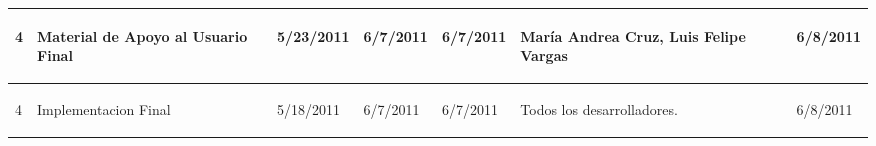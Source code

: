 \begin{center}
\begin{longtable}{|p{}|p{}|p{}|p{}|p{}|p{}|p{}|p{}|}
{\begin{center} 4 \end{center}} & 
{\begin{center} Material de Apoyo al Usuario Final \end{center}} & 
{\begin{center} 5/23/2011 \end{center}} & 
{\begin{center} 6/7/2011 \end{center}} & 
{\begin{center} 6/7/2011 \end{center}} & 
{\begin{center} María Andrea Cruz, Luis Felipe Vargas \end{center}} & 
{\begin{center}  \end{center}} & 
{\begin{center} 6/8/2011 \end{center}}\\
\hline
	
{\begin{center} 4 \end{center}} & 
{\begin{center} Implementacion Final \end{center}} & 
{\begin{center} 5/18/2011 \end{center}} & 
{\begin{center} 6/7/2011 \end{center}} & 
{\begin{center} 6/7/2011 \end{center}} & 
{\begin{center} Todos los desarrolladores. \end{center}} & 
{\begin{center}  \end{center}} & 
{\begin{center} 6/8/2011 \end{center}}\\
\hline


\end{longtable}
\end{center}
